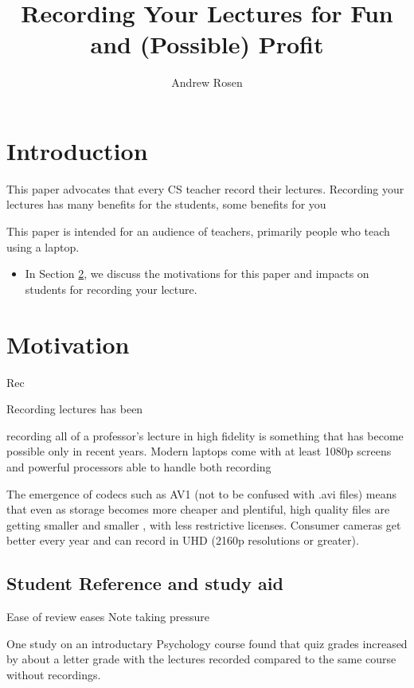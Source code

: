 \documentclass[sigconf]{acmart}
\title{Recording Your Lectures for Fun and (Possible) Profit}
\author{Andrew Rosen}
\affiliation{\institution{Temple University}}
\begin{document}
\maketitle



\section{Introduction}


This paper advocates that every CS teacher record their lectures.
Recording your lectures has many benefits for the students, some benefits for you \cite{Nobody06}

This paper is intended for an audience of teachers, primarily people who teach using a laptop.




\begin{itemize}
	\item In Section \ref{why}, we discuss the motivations for this paper and impacts  on students for recording your lecture.
\end{itemize}
\section{Motivation}
\label{why}
Rec

Recording lectures has been

recording all of a professor's lecture in high fidelity is something that has become possible only in recent years.
Modern laptops come with at least 1080p screens and powerful processors able to handle both recording 

The emergence of codecs such as AV1 (not to be confused with .avi files) means that even as storage becomes more cheaper and plentiful, high quality files are getting smaller and smaller \cite{AV1comp}, with less restrictive licenses. 
Consumer cameras get better every year and can record in UHD (2160p resolutions or greater).


\subsection{Student Reference and study aid}


Ease of review
eases Note taking pressure


One study \cite{shimoff2001effects}  on an introductary Psychology course found that quiz grades increased by about a letter grade with the lectures recorded compared to the same course without recordings.
\end{document}

